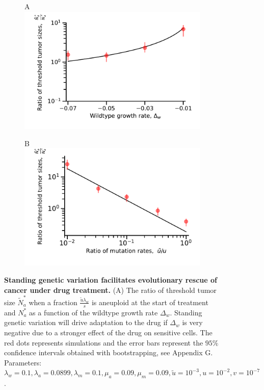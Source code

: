 \documentclass[12pt]{extarticle}
\begin{document}
\begin{figure}
\begin{subfigure}{0.5\textwidth}
A\\
\includegraphics[width=1\textwidth]{Figures/RatiodwPlot.pdf}
\end{subfigure}
\begin{subfigure}{0.5\textwidth}
B\\
\includegraphics[width=1\textwidth]{Figures/ratio_uPlot.pdf}
\end{subfigure}
\caption{
\textbf{Standing genetic variation facilitates evolutionary rescue of cancer under drug treatment.}
(A)  The ratio of threshold tumor size $\tilde{N}_a^*$ when a fraction $\frac{\tilde{u}\lambda_w}{s}$ is aneuploid at the start of treatment and $N_a^*$ as a function of the wildtype growth rate $\Delta_w$.  Standing genetic variation will drive adaptation to the drug if $\Delta_w$ is very negative due to a stronger effect of the drug on sensitive cells. The red dots represents simulations and the error bars represent the $95\%$ confidence intervals obtained with bootstrapping, see Appendix G. Parameters: $\lambda_w=0.1,\lambda_a=0.0899,\lambda_m=0.1,\mu_a=0.09,\mu_m=0.09,\tilde{u}=10^{-3},u=10^{-2}, v=10^{-7}$.
}
\end{figure}
\end{document}
